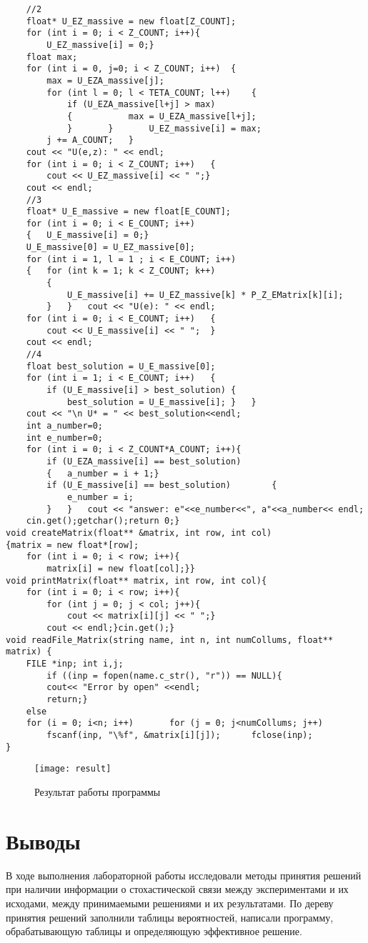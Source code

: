 \documentclass[a4paper,14pt]{extarticle}
\begin{document}
\begin{lstlisting}
	//2
	float* U_EZ_massive = new float[Z_COUNT];
	for (int i = 0; i < Z_COUNT; i++){
		U_EZ_massive[i] = 0;}
	float max;
	for (int i = 0, j=0; i < Z_COUNT; i++)	{
		max = U_EZA_massive[j];
		for (int l = 0; l < TETA_COUNT; l++)	{
			if (U_EZA_massive[l+j] > max)
			{			max = U_EZA_massive[l+j];
			}		}		U_EZ_massive[i] = max;
		j += A_COUNT;	}
	cout << "U(e,z): " << endl;
	for (int i = 0; i < Z_COUNT; i++)	{
		cout << U_EZ_massive[i] << " ";}
	cout << endl;
	//3
	float* U_E_massive = new float[E_COUNT];
	for (int i = 0; i < E_COUNT; i++)
	{	U_E_massive[i] = 0;}
	U_E_massive[0] = U_EZ_massive[0];
	for (int i = 1, l = 1 ; i < E_COUNT; i++)
	{	for (int k = 1; k < Z_COUNT; k++)
		{
			U_E_massive[i] += U_EZ_massive[k] * P_Z_EMatrix[k][i];
		}	}	cout << "U(e): " << endl;
	for (int i = 0; i < E_COUNT; i++)	{
		cout << U_E_massive[i] << " ";	}
	cout << endl;
	//4
	float best_solution = U_E_massive[0];
	for (int i = 1; i < E_COUNT; i++)	{
		if (U_E_massive[i] > best_solution)	{
			best_solution = U_E_massive[i];	}	}
	cout << "\n U* = " << best_solution<<endl;
	int a_number=0;
	int e_number=0;
	for (int i = 0; i < Z_COUNT*A_COUNT; i++){
		if (U_EZA_massive[i] == best_solution)
		{	a_number = i + 1;}
		if (U_E_massive[i] == best_solution)		{
			e_number = i;
		}	}	cout << "answer: e"<<e_number<<", a"<<a_number<< endl;
	cin.get();getchar();return 0;}
void createMatrix(float** &matrix, int row, int col)
{matrix = new float*[row];
	for (int i = 0; i < row; i++){
		matrix[i] = new float[col];}}
void printMatrix(float** matrix, int row, int col){
	for (int i = 0; i < row; i++){
		for (int j = 0; j < col; j++){
			cout << matrix[i][j] << " ";}
		cout << endl;}cin.get();}
void readFile_Matrix(string name, int n, int numCollums, float** matrix) {
	FILE *inp; int i,j;
		if ((inp = fopen(name.c_str(), "r")) == NULL){
		cout<< "Error by open" <<endl;
		return;}
	else
	for (i = 0; i<n; i++)		for (j = 0; j<numCollums; j++)
        fscanf(inp, "\%f", &matrix[i][j]);		fclose(inp);
}
\end{lstlisting}

\begin{figure}[H]
    \centering
    \texttt{[image: result]}
    \caption{Результат работы программы}
    \label{fig:result}
\end{figure}

\section*{Выводы}
В ходе выполнения лабораторной работы исследовали методы принятия решений при
наличии информации о стохастической связи между экспериментами и их исходами,
между принимаемыми решениями и их результатами. По дереву принятия решений
заполнили таблицы вероятностей, написали программу, обрабатывающую таблицы и
определяющую эффективное решение.
\end{document}
